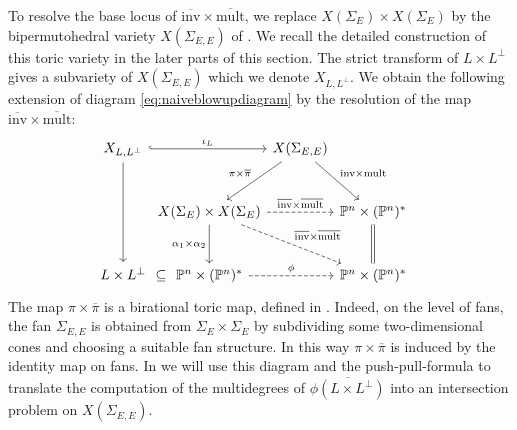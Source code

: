 \documentclass[12pt,a4paper,english]{scrartcl}
\newcommand{\PP}{\mathbb{P}}
\begin{document}
To resolve the base locus of $\overline{\text{inv}}\times \overline{\text{mult}}$, we replace $X(\Sigma_E)\times X(\Sigma_E)$ by the bipermutohedral variety $X(\Sigma_{E,E})$ of \cite{Ardila2022}. We recall the detailed construction of this toric variety in the later parts of this section. The strict transform of $L\times L^\perp$ gives a subvariety of $X(\Sigma_{E,E})$ which we denote $X_{L,L^\perp}$. We obtain the following extension of diagram \eqref{eq:naiveblowupdiagram} by the resolution of the map $\overline{\text{inv}}\times \overline{\text{mult}}$:
\begin{equation}
\label{eq:cool_diagram}
\begin{tikzcd}[column sep=0pt, row sep=large]
{X_{L,L^\perp}} \arrow[rr, "\iota_L", hook] \arrow[dd] &                                                                                                                                                                                                            & {X(\Sigma_{E,E})} \arrow[ld, "\pi \times \overline \pi"'] \arrow[rd, "\mathrm{inv}\times \mathrm{mult}"] &                                                    & {}  \\
& X(\Sigma_E) \times X(\Sigma_E) \arrow[d, "\alpha_1 \times \alpha_2"'] \arrow[rr, "\overline{\mathrm{inv}} \times \overline{\mathrm{mult}}", dashed] \arrow[rrd, dashed, "\overline{\text{inv}}\times \overline{\mathrm{mult}}"] &                                                                                                          & \PP^n \times (\PP^n)^* \arrow[d, no head, equals]  & {}                                           \\
L \times L^\perp \arrow[r, "\subseteq", phantom]               & \PP^n \times (\PP^n)^* \arrow[rr, "\phi", dashed]                                                                                                                              &                                                                                                          & \PP^n \times (\PP^n)^* &                                             
\end{tikzcd}
\end{equation}
The map $\pi\times \overline{\pi}$ is a birational toric map, defined in \cite[Proposition 2.11]{Ardila2022}. Indeed, on the level of fans, the fan $\Sigma_{E,E}$ is obtained from $\Sigma_E\times \Sigma_E$ by subdividing some two-dimensional cones and choosing a suitable fan structure. In this way $\pi\times \overline{\pi}$ is induced by the identity map on fans. In  we will use this diagram and the push-pull-formula to translate the computation of the multidegrees of $\overline{\phi(L\times L^\perp)}$ into an intersection problem on $X(\Sigma_{E,E})$.
\end{document}
